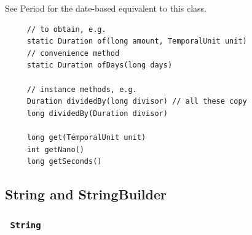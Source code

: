 \documentclass{scrartcl}
\begin{document}
    See Period for the date-based equivalent to this class.

     \begin{lstlisting}
     // to obtain, e.g.
     static Duration of(long amount, TemporalUnit unit)
     // convenience method
     static Duration ofDays(long days)

     // instance methods, e.g.
     Duration dividedBy(long divisor) // all these copy
     long dividedBy(Duration divisor)

     long get(TemporalUnit unit)
     int getNano()
     long getSeconds()
     \end{lstlisting}

 \subsection{String and StringBuilder}
 \subsubsection{\lstinline$ String $}
\end{document}
